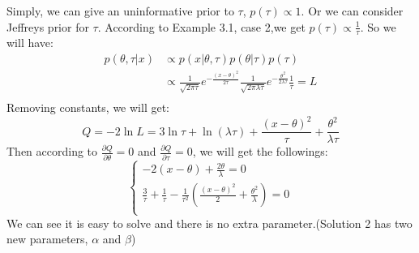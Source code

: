 \documentclass[11pt]{article}
\begin{document}
\begin{description}
\begin{description}
Simply, we can give an uninformative prior to $\tau$, $p(\tau) \propto 1$. Or we can consider Jeffreys prior for $\tau$. According to Example 3.1, case 2,we get $p(\tau)\propto \frac{1}{\tau}$. So we will have:
\[\begin{split}
p(\theta, \tau | x) &\propto p(x | \theta, \tau) p(\theta | \tau) p(\tau) \\
&\propto \frac{1}{\sqrt{2\pi\tau}} e^{-\frac{(x-\theta)^2}{2\tau}} \frac{1}{\sqrt{2\pi\lambda\tau}} e^{-\frac{\theta^2}{2\lambda\tau}} \frac{1}{\tau}=L \\
\end{split}\]
Removing constants, we will get:
\[ Q = -2\ln L = 3\ln\tau + \ln(\lambda\tau) + \frac{(x-\theta)^2}{\tau} + \frac{\theta^2}{\lambda\tau} \]
Then according to $\frac{\partial Q}{\partial \theta} = 0$ and $\frac{\partial Q}{\partial \tau} = 0$, we will get the followings:
\[\begin{cases}
-2(x-\theta)+\frac{2\theta}{\lambda} = 0 \\
\frac{3}{\tau}+\frac{1}{\tau}-\frac{1}{\tau^2}\left(\frac{(x-\theta)^2}{2}+\frac{\theta^2}{\lambda}\right) = 0 \\
\end{cases}\]
We can see it is easy to solve and there is no extra parameter.(Solution 2 has two new parameters, $\alpha$ and $\beta$)
\end{description}
\end{description}
\end{document}
